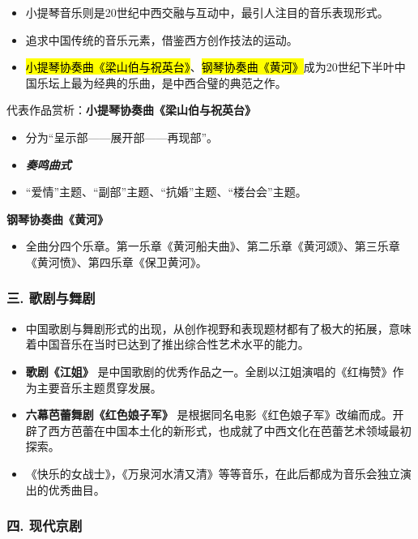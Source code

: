 \documentclass[
]{article}
\providecommand{\tightlist}{%
  \setlength{\itemsep}{0pt}\setlength{\parskip}{0pt}}
\begin{document}
\begin{itemize}
\item
  小提琴音乐则是20世纪中西交融与互动中，最引人注目的音乐表现形式。
\item
  追求中国传统的音乐元素，借鉴西方创作技法的运动。
\item
  \hl{\mbox{小提琴协奏曲《梁山伯与祝英台》}}、\hl{\mbox{钢琴协奏曲《黄河》}}成为20世纪下半叶中国乐坛上最为经典的乐曲，是中西合璧的典范之作。
\end{itemize}

代表作品赏析：\textbf{小提琴协奏曲《梁山伯与祝英台》}

\begin{itemize}
\tightlist
\item
  分为``呈示部------展开部------再现部''。
\item
  \textbf{\emph{奏鸣曲式}}
\item
  ``爱情''主题、``副部''主题、``抗婚''主题、``楼台会''主题。
\end{itemize}

\textbf{钢琴协奏曲《黄河》}

\begin{itemize}
\tightlist
\item
  全曲分四个乐章。第一乐章《黄河船夫曲》、第二乐章《黄河颂》、第三乐章《黄河愤》、第四乐章《保卫黄河》。
\end{itemize}

\subsubsection{三.
歌剧与舞剧}\label{ux4e09.-ux6b4cux5267ux4e0eux821eux5267}

\begin{itemize}
\item
  中国歌剧与舞剧形式的出现，从创作视野和表现题材都有了极大的拓展，意味着中国音乐在当时已达到了推出综合性艺术水平的能力。
\item
  \textbf{歌剧《江姐》}
  是中国歌剧的优秀作品之一。全剧以江姐演唱的《红梅赞》作为主要音乐主题贯穿发展。
\item
  \textbf{六幕芭蕾舞剧《红色娘子军》}
  是根据同名电影《红色娘子军》改编而成。开辟了西方芭蕾在中国本土化的新形式，也成就了中西文化在芭蕾艺术领域最初探索。
\item
  《快乐的女战士》，《万泉河水清又清》等等音乐，在此后都成为音乐会独立演出的优秀曲目。
\end{itemize}

\subsubsection{四. 现代京剧}\label{ux56db.-ux73b0ux4ee3ux4eacux5267}
\end{document}
